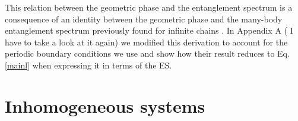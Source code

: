 \documentclass[twocolumn,amsmath,longbibliography,amssymb,superscriptaddress]{revtex4-1}
\newcommand{\carlos}[1]{{\color{red} #1}}
\begin{document}
This relation between the geometric phase and the entanglement spectrum is a consequence of an identity between the geometric phase and the many-body entanglement spectrum previously found for infinite chains \cite{Zaletel2014}. In Appendix A (\carlos{I have to take a look at it again}) we modified this derivation to account for the periodic boundary conditions we use and show how their result reduces to Eq. \ref{mainl} when expressing it in terms of the ES.


\begin{figure}[h]
\centering
{}
\caption{}
\label{disorder}
\end{figure}

\section{Inhomogeneous systems}
\end{document}

